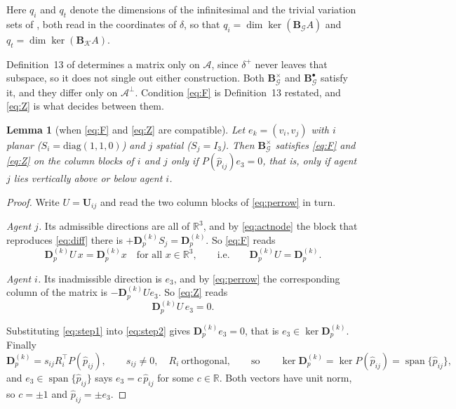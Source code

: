 \documentclass[11pt,a4paper]{article}
\theoremstyle{plain}
\newtheorem{lemma}{Lemma}
\theoremstyle{definition}
\newcommand{\R}{\mathbb{R}}
\newcommand{\vspan}{\operatorname{span}}
\newcommand{\Bper}{\mathbf{B}^{\times}}
\newcommand{\Bnode}{\mathbf{B}^{\bullet}}
\newcommand{\Dp}{\mathbf{D}_p}
\begin{document}
Here $q_i$ and $q_t$ denote the dimensions of the infinitesimal and the trivial
variation sets of \cite{michieletto2021}, both read in the coordinates of
$\delta$, so that $q_i=\dim\ker(\mathbf B_{\mathcal G}A)$ and
$q_t=\dim\ker(\mathbf B_{\mathcal K}A)$.

Definition~13 of \cite{michieletto2021} determines a matrix only on
$\mathcal A$, since $\delta^+$ never leaves that subspace, so it does not
single out either construction. Both $\Bper_{\mathcal G}$ and
$\Bnode_{\mathcal G}$ satisfy it, and they differ only on $\mathcal A^\perp$.
Condition \eqref{eq:F} is Definition~13 restated, and \eqref{eq:Z} is what
decides between them.


\begin{lemma}[when \eqref{eq:F} and \eqref{eq:Z} are compatible]\label{lem:obstruction}
Let $e_k=(v_i,v_j)$ with $i$ planar ($S_i=\mathrm{diag}(1,1,0)$) and $j$
spatial ($S_j=I_3$). Then $\Bper_{\mathcal G}$ satisfies \eqref{eq:F} and
\eqref{eq:Z} on the column blocks of $i$ and $j$ only if $P(\hat p_{ij})e_3=0$,
that is, only if agent $j$ lies vertically above or below agent $i$.
\end{lemma}

\begin{proof}
Write $U=\mathbf U_{ij}$ and read the two column blocks of \eqref{eq:perrow} in
turn.

\emph{Agent $j$.} Its admissible directions are all of $\R^3$, and by
\eqref{eq:actnode} the block that reproduces \eqref{eq:diff} there is
$+\Dp^{(k)}S_j=\Dp^{(k)}$. So \eqref{eq:F} reads
\begin{equation}\label{eq:step1}
  \Dp^{(k)}U\,x=\Dp^{(k)}x\quad\text{for all }x\in\R^3,
  \qquad\text{i.e.}\qquad
  \Dp^{(k)}U=\Dp^{(k)} .
\end{equation}

\emph{Agent $i$.} Its inadmissible direction is $e_3$, and by \eqref{eq:perrow}
the corresponding column of the matrix is $-\Dp^{(k)}Ue_3$. So \eqref{eq:Z}
reads
\begin{equation}\label{eq:step2}
  \Dp^{(k)}U\,e_3=0 .
\end{equation}

Substituting \eqref{eq:step1} into \eqref{eq:step2} gives
$\Dp^{(k)}e_3=0$, that is $e_3\in\ker\Dp^{(k)}$. Finally
\begin{equation*}
  \Dp^{(k)}=s_{ij}R_i^\top P(\hat p_{ij}),
  \qquad s_{ij}\neq0,\quad R_i\ \text{orthogonal},
  \qquad\text{so}\qquad
  \ker\Dp^{(k)}=\ker P(\hat p_{ij})=\vspan\{\hat p_{ij}\},
\end{equation*}
and $e_3\in\vspan\{\hat p_{ij}\}$ says $e_3=c\,\hat p_{ij}$ for some $c\in\R$.
Both vectors have unit norm, so $c=\pm1$ and $\hat p_{ij}=\pm e_3$.
\end{proof}
\end{document}
